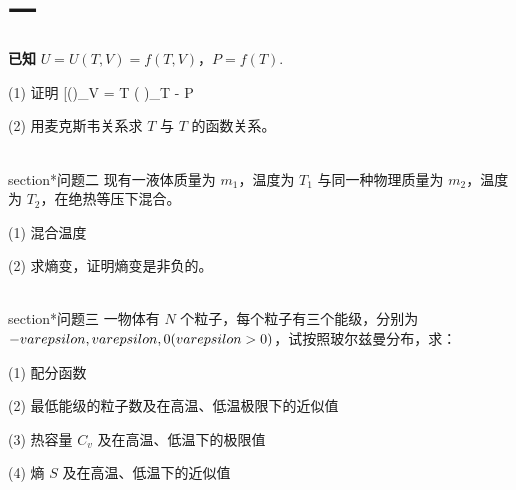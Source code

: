 \section{一}\textbf{已知} $U = U(T, V) = f(T, V)$，$P = f(T)$.

(1) 证明
[\left(\right)_V = T \left(  \right)_T - P\]

(2) 用麦克斯韦关系求 $T$ 与 $T$ 的函数关系。

\\section*{问题二}
现有一液体质量为 $m_1$，温度为 $T_1$ 与同一种物理质量为 $m_2$，温度为 $T_2$，在绝热等压下混合。

(1) 混合温度

(2) 求熵变，证明熵变是非负的。

\\section*{问题三}
一物体有 $N$ 个粒子，每个粒子有三个能级，分别为 $-\\varepsilon, \\varepsilon, 0 (\\varepsilon > 0)$，试按照玻尔兹曼分布，求：

(1) 配分函数

(2) 最低能级的粒子数及在高温、低温极限下的近似值

(3) 热容量 $C_v$ 及在高温、低温下的极限值

(4) 熵 $S$ 及在高温、低温下的近似值